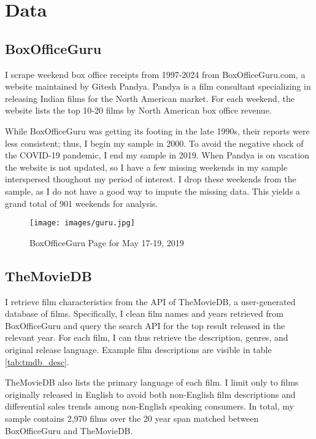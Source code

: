 \documentclass{article}
\begin{document}
\section{Data}

\subsection{BoxOfficeGuru}

I scrape weekend box office receipts from 1997-2024 from BoxOfficeGuru.com, a website maintained by Gitesh Pandya. Pandya is a film consultant specializing in releasing Indian films for the North American market. For each weekend, the website lists the top 10-20 films by North American box office revenue. 

While BoxOfficeGuru was getting its footing in the late 1990s, their reports were less consistent; thus, I begin my sample in 2000. To avoid the negative shock of the COVID-19 pandemic, I end my sample in 2019. When Pandya is on vacation the website is not updated, so I have a few missing weekends in my sample interspersed thoughout my period of interest. I drop these weekends from the sample, as I do not have a good way to impute the missing data. This yields a grand total of 901 weekends for analysis.

\begin{figure}
    \texttt{[image: images/guru.jpg]}
    \caption{BoxOfficeGuru Page for May 17-19, 2019}
    \label{fig:guru}
\end{figure}


\subsection{TheMovieDB}

I retrieve film characteristics from the API of TheMovieDB, a user-generated database of films. Specifically, I clean film names and years retrieved from BoxOfficeGuru and query the search API for the top result released in the relevant year. For each film, I can thus retrieve the description, genres, and original release language. Example film descriptions are visible in table \ref{tab:tmdb_desc}.

TheMovieDB also lists the primary language of each film. I limit only to films originally released in English to avoid both non-English film descriptions and differential sales trends among non-English speaking consumers. In total, my sample contains 2,970 films over the 20 year span matched between BoxOfficeGuru and TheMovieDB.
\end{document}

